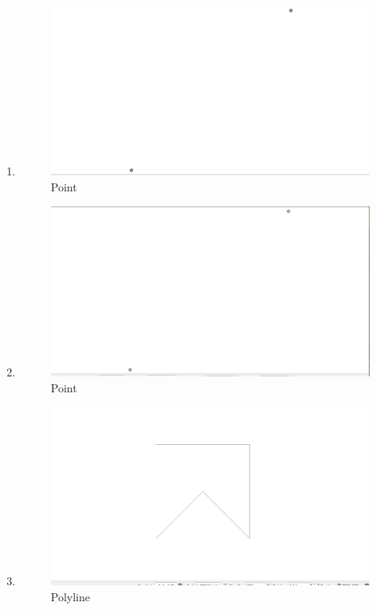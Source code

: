 \begin{enumerate}
	\item 
	
	\begin{figure}[H]
		\includegraphics[width=12cm]{figures/1174031/2/hasil3.PNG}
		\centering
		\caption{Point}
	\end{figure}
	
	\item 
	
	\begin{figure}[H]
		\includegraphics[width=12cm]{figures/1174031/2/hasil4.PNG}
		\centering
		\caption{Point}
	\end{figure}
	
	\item 
	
	\begin{figure}[H]
		\includegraphics[width=12cm]{figures/1174031/2/hasil5.PNG}
		\centering
		\caption{Polyline}
	\end{figure}
	

\end{enumerate}
